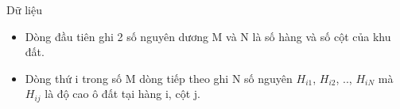 Dữ liệu
\begin{itemize}
	\item Dòng đầu tiên ghi 2 số nguyên dương M và N là số hàng và số cột của khu đất.
	\item Dòng thứ i trong số M dòng tiếp theo ghi N số nguyên $H_{i1}$, $H_{i2}$, .., $H_{iN}$ mà $H_{ij}$ là độ cao ô đất tại hàng i, cột j.
\end{itemize}